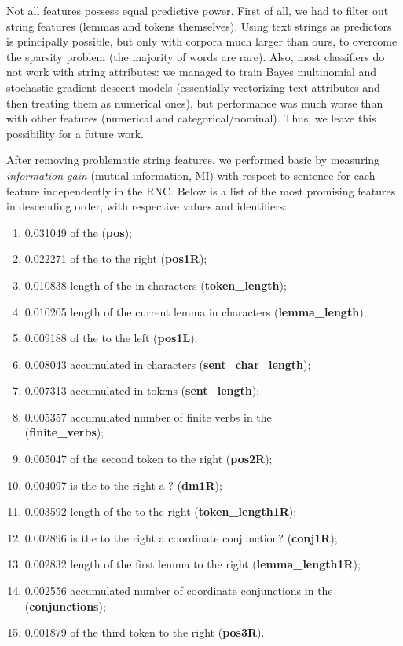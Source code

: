 \documentclass[output=paper]{langsci/langscibook.cls}
\begin{document}
Not all features possess equal predictive power. First of all, we had to filter out string features (lemmas and tokens themselves). Using text strings as predictors is principally possible, but only with corpora much larger than ours, to overcome the sparsity problem (the majority of words are rare). Also, most classifiers do not work with string attributes: we managed to train Bayes multinomial and stochastic gradient descent models (essentially vectorizing text attributes and then treating them as numerical ones), but performance was much worse than with other features (numerical and categorical/nominal). Thus, we leave this possibility for a future work.

After removing problematic string features, we performed basic  by measuring \textit{information gain} (mutual information, MI) with respect to sentence  for each feature independently in the RNC. Below is a list of the most promising features in descending order, with respective  values and identifiers: 
\begin{enumerate}
\item 0.031049  of the  (\textbf{pos});
\item 0.022271  of the  to the right (\textbf{pos1R});
\item 0.010838 length of the  in characters (\textbf{token\_length});
\item 0.010205 length of the current lemma in characters (\textbf{lemma\_length});
\item 0.009188  of the  to the left (\textbf{pos1L});
\item 0.008043 accumulated  in characters (\textbf{sent\_char\_length});
\item 0.007313 accumulated  in tokens (\textbf{sent\_length});
\item 0.005357 accumulated number of finite verbs in the \\ (\textbf{finite\_verbs});
\item 0.005047  of the second token to the right (\textbf{pos2R});
\item 0.004097 is the  to the right a ? (\textbf{dm1R});
\item 0.003592 length of the  to the right (\textbf{token\_length1R});
\item 0.002896 is the  to the right a coordinate conjunction? (\textbf{conj1R});
\item 0.002832 length of the first lemma to the right (\textbf{lemma\_length1R});
\item 0.002556 accumulated number of coordinate conjunctions in the  (\textbf{conjunctions});
\item 0.001879  of the third token to the right (\textbf{pos3R}).
\end{enumerate}
\end{document}
